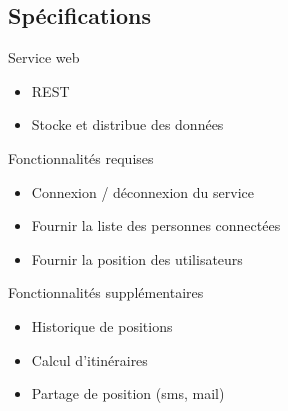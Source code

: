 \documentclass{beamer} %
\begin{document}
  \subsection{Spécifications}
  \begin{frame}{\subsecname}
    \begin{block}{Service web}
      \begin{itemize}
        \item REST
        \item Stocke et distribue des données
      \end{itemize}
    \end{block}

    \begin{alertblock}{Fonctionnalités requises}
      \begin{itemize}
        \item Connexion / déconnexion du service
        \item Fournir la liste des personnes connectées
        \item Fournir la position des utilisateurs
      \end{itemize}
    \end{alertblock}

    \begin{exampleblock}{Fonctionnalités supplémentaires}
      \begin{itemize}
        \item Historique de positions
        \item Calcul d'itinéraires
        \item Partage de position (sms, mail)
      \end{itemize}
    \end{exampleblock}

  \end{frame}
\end{document}
